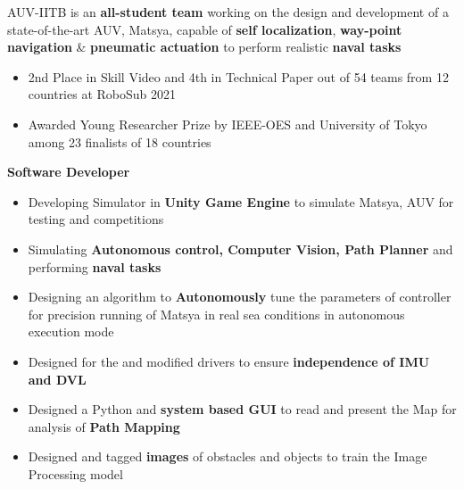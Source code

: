 \documentclass[a4paper,11pt]{article}
\begin{document}
AUV-IITB is an \textbf{all-student team} working on the design and development of a state-of-the-art AUV, Matsya, 
capable of \textbf{self localization}, \textbf{way-point navigation} \& \textbf{pneumatic actuation} to perform realistic 
\textbf{naval tasks} \\
\vspace{-20pt}

\begin{itemize}[itemsep = -1.0mm, leftmargin = 0.2in]
\item 2nd Place in Skill Video and 4th in Technical Paper out of 54 teams from 12 countries at RoboSub 2021
\item Awarded Young Researcher Prize by IEEE-OES and University of Tokyo among 23 finalists of 18 countries
\end{itemize}
\vspace{-5pt}
\hspace{1pt} \textbf{Software Developer}
\vspace{-5pt}
\begin{itemize}[itemsep = -1.0mm, leftmargin = 0.2in]

\item Developing Simulator in \textbf{Unity Game Engine} to simulate Matsya, AUV for testing and competitions
\item Simulating \textbf{Autonomous control, Computer Vision, Path Planner} and performing \textbf{naval tasks}
\item Designing an algorithm to \textbf{Autonomously} tune the parameters of controller for precision running of Matsya in real sea conditions in autonomous execution mode 
\item Designed  for the  and modified drivers to ensure \textbf{independence of IMU and DVL}
\item Designed a Python and \textbf{system based GUI} to read and present the Map for analysis of \textbf{Path Mapping}
\item Designed and tagged \textbf{images} of obstacles and objects to train the Image Processing model
\end{itemize}
\vspace{-20pt}
\end{document}
